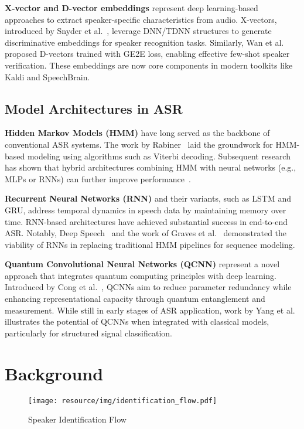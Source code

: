 \documentclass[conference]{IEEEtran}
\begin{document}
\textbf{X-vector and D-vector embeddings} represent deep learning-based approaches to extract speaker-specific characteristics from audio. X-vectors, introduced by Snyder et al.~\cite{Snyder2018Xvectors}, leverage DNN/TDNN structures to generate discriminative embeddings for speaker recognition tasks. Similarly, Wan et al.~\cite{Wan2018Generalized} proposed D-vectors trained with GE2E loss, enabling effective few-shot speaker verification. These embeddings are now core components in modern toolkits like Kaldi and SpeechBrain.

\subsection{Model Architectures in ASR}

\textbf{Hidden Markov Models (HMM)} have long served as the backbone of conventional ASR systems. The work by Rabiner~\cite{rabiner1989tutorial} laid the groundwork for HMM-based modeling using algorithms such as Viterbi decoding. Subsequent research has shown that hybrid architectures combining HMM with neural networks (e.g., MLPs or RNNs) can further improve performance~\cite{voll2007hybrid, perero2022comparison}.

\textbf{Recurrent Neural Networks (RNN)} and their variants, such as LSTM and GRU, address temporal dynamics in speech data by maintaining memory over time. RNN-based architectures have achieved substantial success in end-to-end ASR. Notably, Deep Speech~\cite{hannun2014deep} and the work of Graves et al.~\cite{graves2013speech} demonstrated the viability of RNNs in replacing traditional HMM pipelines for sequence modeling.

\textbf{Quantum Convolutional Neural Networks (QCNN)} represent a novel approach that integrates quantum computing principles with deep learning. Introduced by Cong et al.~\cite{Cong2019QuantumCNN}, QCNNs aim to reduce parameter redundancy while enhancing representational capacity through quantum entanglement and measurement. While still in early stages of ASR application, work by Yang et al.~\cite{Yang2021Decentralizing} illustrates the potential of QCNNs when integrated with classical models, particularly for structured signal classification.


\section{Background}


\begin{figure}[H]
    \centering
    \begin{minipage}{0.5\textwidth}
        \centering
        \texttt{[image: resource/img/identification\_flow.pdf]}
        \caption{Speaker Identification Flow}
        \label{fig:identification_flow}
    \end{minipage}

\end{figure}
\end{document}
